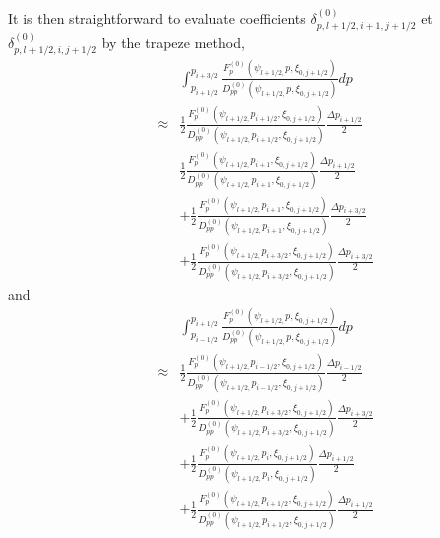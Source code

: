 It is then straightforward to evaluate coefficients $\delta
_{p,l+1/2,i+1,j+1/2}^{\left( 0\right) }$ et $\delta
_{p,l+1/2,i,j+1/2}^{\left( 0\right) }$ by the trapeze method,
\begin{eqnarray}
&&\int_{p_{i+1/2}}^{p_{i+3/2}}\frac{F_{p}^{\left( 0\right) }\left( \psi
_{l+1/2,}p,\xi _{0,j+1/2}\right) }{D_{pp}^{\left( 0\right) }\left( \psi
_{l+1/2,}p,\xi _{0,j+1/2}\right) }dp  \nonumber \\
&\approx &\frac{1}{2}\frac{F_{p}^{\left( 0\right) }\left( \psi
_{l+1/2,}p_{i+1/2},\xi _{0,j+1/2}\right) }{D_{pp}^{\left( 0\right) }\left(
\psi _{l+1/2,}p_{i+1/2},\xi _{0,j+1/2}\right) }\frac{\Delta p_{i+1/2}}{2}
\nonumber \\
&&\frac{1}{2}\frac{F_{p}^{\left( 0\right) }\left( \psi _{l+1/2,}p_{i+1},\xi
_{0,j+1/2}\right) }{D_{pp}^{\left( 0\right) }\left( \psi
_{l+1/2,}p_{i+1},\xi _{0,j+1/2}\right) }\frac{\Delta p_{i+1/2}}{2}  \nonumber
\\
&&+\frac{1}{2}\frac{F_{p}^{\left( 0\right) }\left( \psi _{l+1/2,}p_{i+1},\xi
_{0,j+1/2}\right) }{D_{pp}^{\left( 0\right) }\left( \psi
_{l+1/2,}p_{i+1},\xi _{0,j+1/2}\right) }\frac{\Delta p_{i+3/2}}{2}  \nonumber
\\
&&+\frac{1}{2}\frac{F_{p}^{\left( 0\right) }\left( \psi
_{l+1/2,}p_{i+3/2},\xi _{0,j+1/2}\right) }{D_{pp}^{\left( 0\right) }\left(
\psi _{l+1/2,}p_{i+3/2},\xi _{0,j+1/2}\right) }\frac{\Delta p_{i+3/2}}{2}
\end{eqnarray}
and
\begin{eqnarray}
&&\int_{p_{i-1/2}}^{p_{i+1/2}}\frac{F_{p}^{\left( 0\right) }\left( \psi
_{l+1/2,}p,\xi _{0,j+1/2}\right) }{D_{pp}^{\left( 0\right) }\left( \psi
_{l+1/2,}p,\xi _{0,j+1/2}\right) }dp  \nonumber \\
&\approx &\frac{1}{2}\frac{F_{p}^{\left( 0\right) }\left( \psi
_{l+1/2,}p_{i-1/2},\xi _{0,j+1/2}\right) }{D_{pp}^{\left( 0\right) }\left(
\psi _{l+1/2,}p_{i-1/2},\xi _{0,j+1/2}\right) }\frac{\Delta p_{i-1/2}}{2}
\nonumber \\
&&+\frac{1}{2}\frac{F_{p}^{\left( 0\right) }\left( \psi
_{l+1/2,}p_{i+3/2},\xi _{0,j+1/2}\right) }{D_{pp}^{\left( 0\right) }\left(
\psi _{l+1/2,}p_{i+3/2},\xi _{0,j+1/2}\right) }\frac{\Delta p_{i+3/2}}{2}
\nonumber \\
&&+\frac{1}{2}\frac{F_{p}^{\left( 0\right) }\left( \psi _{l+1/2,}p_{i},\xi
_{0,j+1/2}\right) }{D_{pp}^{\left( 0\right) }\left( \psi _{l+1/2,}p_{i},\xi
_{0,j+1/2}\right) }\frac{\Delta p_{i+1/2}}{2}  \nonumber \\
&&+\frac{1}{2}\frac{F_{p}^{\left( 0\right) }\left( \psi
_{l+1/2,}p_{i+1/2},\xi _{0,j+1/2}\right) }{D_{pp}^{\left( 0\right) }\left(
\psi _{l+1/2,}p_{i+1/2},\xi _{0,j+1/2}\right) }\frac{\Delta p_{i+1/2}}{2}
\end{eqnarray}
